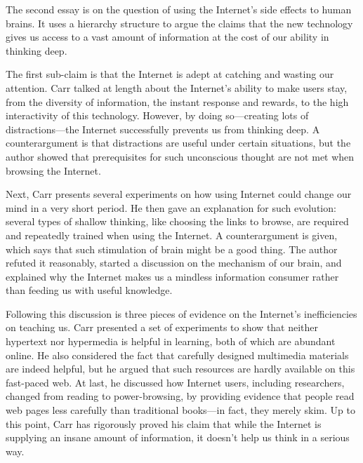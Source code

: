 \documentclass{writing}
\begin{document}
The second essay is on the question of using the Internet's side effects
to human brains. It uses a hierarchy structure to argue the claims that
the new technology gives us access to a vast amount of information at
the cost of our ability in thinking deep.

The first sub-claim is that the Internet is adept at catching and
wasting our attention. Carr talked at length about the Internet's
ability to make users stay, from the diversity of information, the
instant response and rewards, to the high interactivity of this
technology. However, by doing so---creating lots of distractions---the
Internet successfully prevents us from thinking deep. A counterargument
is that distractions are useful under certain situations, but the author
showed that prerequisites for such unconscious thought are not met when
browsing the Internet.

Next, Carr presents several experiments on how using Internet could
change our mind in a very short period. He then gave an explanation for
such evolution: several types of shallow thinking, like choosing the
links to browse, are required and repeatedly trained when using the
Internet. A counterargument is given, which says that such stimulation
of brain might be a good thing. The author refuted it reasonably,
started a discussion on the mechanism of our brain, and explained why
the Internet makes us a mindless information consumer rather than
feeding us with useful knowledge.

Following this discussion is three pieces of evidence on the Internet's
inefficiencies on teaching us. Carr presented a set of experiments to
show that neither hypertext nor hypermedia is helpful in learning, both
of which are abundant online. He also considered the fact that carefully
designed multimedia materials are indeed helpful, but he argued that
such resources are hardly available on this fast-paced web. At last, he
discussed how Internet users, including researchers, changed from
reading to power-browsing, by providing evidence that people read web
pages less carefully than traditional books---in fact, they merely skim.
Up to this point, Carr has rigorously proved his claim that while the
Internet is supplying an insane amount of information, it doesn't help
us think in a serious way.
\end{document}
